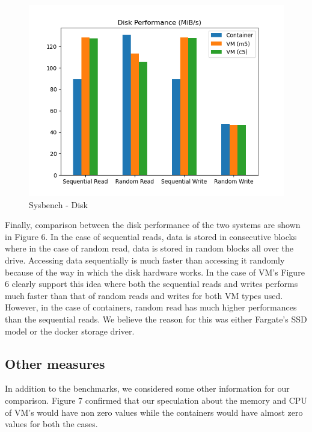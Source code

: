 \documentclass[11pt]{article}
\begin{document}
\begin{figure}[H]
\centering
  \includegraphics[width=0.55\linewidth]{sysbench_disk.png}
  \caption{Sysbench - Disk}
  \label{fig:disk}
\end{figure}

Finally, comparison between the disk performance of the two systems are shown in Figure 6. In the case of sequential reads, data is stored in consecutive blocks where in the case of random read, data is stored in random blocks all over the drive.  Accessing data sequentially is much faster than accessing it randomly because of the way in which the disk hardware works. In the case of VM's Figure 6 clearly support this idea where both the sequential reads and writes performs much faster than that of random reads and writes for both VM types used. However, in the case of containers, random read has much higher performances than the sequential reads. We believe the reason for this was either Fargate's SSD model or the docker storage driver.


\subsection{Other measures}

In addition to the benchmarks, we considered some other information for our comparison. Figure 7 confirmed that our speculation about the memory and CPU of VM's would have non zero values while the containers would have almost zero values for both the cases. 
\end{document}
